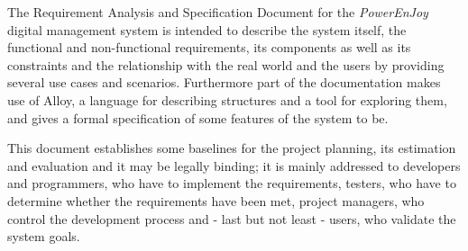 The Requirement Analysis and Specification Document for the \hbox{\textit{PowerEnJoy}} digital management system is intended to describe the system itself, the functional and non-functional requirements, its components as well as its constraints and the relationship with the real world and the users by providing several use cases and scenarios. Furthermore part of the documentation makes use of Alloy, a language for describing structures and a tool for exploring them, and gives a formal specification of some features of the system to be.

This document establishes some baselines for the project planning, its estimation and evaluation and it may be legally binding; it is mainly addressed to developers and programmers, who have to implement the requirements, testers, who have to determine whether the requirements have been met, project managers, who control the development process and - last but not least - users, who validate the system goals.